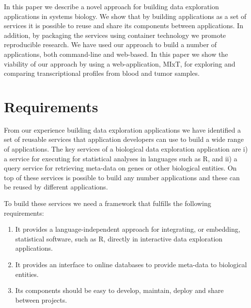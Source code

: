 In this paper we describe a novel approach for building data exploration
applications in systems biology. We show that by building applications as a set
of services it is possible to reuse and share its components between
applications. In addition, by packaging the services using container technology
we promote reproducible research. We have used our approach to build a number of
applications, both command-line and web-based. In this paper we show the
viability of our approach by using a web-application, MIxT, for exploring and
comparing transcriptional profiles from blood and tumor samples. 


\section*{Requirements} 
From our experience building data exploration applications we have identified a
set of reusable services that application developers can use to build a wide
range of applications. The key services of a biological data exploration
application are i) a service for executing for statistical analyses in languages
such as R, and ii) a query service for retrieving meta-data on genes or other
biological entities. On top of these services is possible to build any number
applications and these can be reused by different applications. 

To build these services we need a framework that fulfills the following
requirements: 

\begin{enumerate}
    \item It provides a language-independent approach for integrating, or
        embedding, statistical software, such as R, directly in interactive data
        exploration applications.
    \item It provides an interface to online databases to provide meta-data to
        biological entities. %
    \item Its components should be easy to develop, maintain, deploy and share
        between projects. 
\end{enumerate} 



